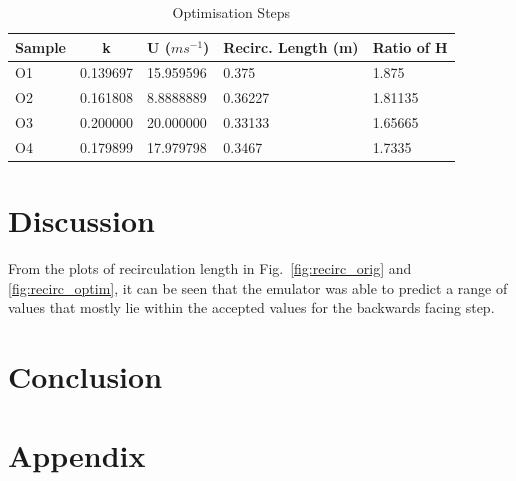 \documentclass[conference]{IEEEtran}
\begin{document}
\begin{table}[ht]
\centering
\caption{Optimisation Steps}
\begin{tabular}{|l|ll|ll|}
\hline
\multicolumn{1}{|c|}{Sample} & \multicolumn{1}{c}{k} & \multicolumn{1}{c|}{U ($ms^{-1}$)} & \multicolumn{1}{c}{Recirc. Length (m)} & \multicolumn{1}{c|}{Ratio of H} \\ \hline
O1                           & 0.139697            & 15.959596                      & 0.375                                  & 1.875                           \\
O2                           & 0.161808           & 8.8888889                      & 0.36227                                & 1.81135                         \\
O3                           & 0.200000                  & 20.000000                               & 0.33133                                & 1.65665                         \\
O4                           & 0.179899            & 17.979798                      & 0.3467                                 & 1.7335                          \\ \hline
\end{tabular}
\label{tab:optim_values}
\end{table}


\section{Discussion}

From the plots of recirculation length in Fig.~\ref{fig:recirc_orig} and \ref{fig:recirc_optim}, it can be seen that the emulator was able to predict a range of values that mostly lie within the accepted values for the backwards facing step.

\clearpage
\section{Conclusion}


\printbibliography
\clearpage

\section{Appendix}





\clearpage
\end{document}

